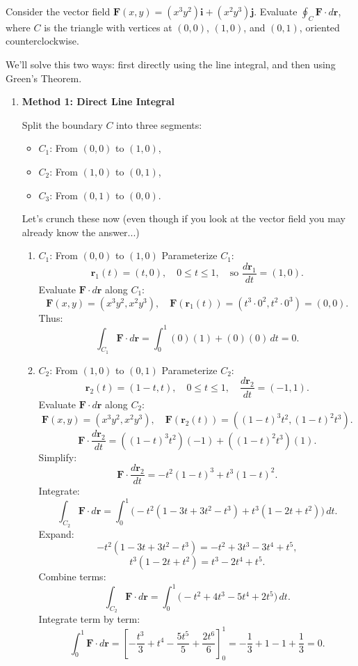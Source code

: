 \exampleline
\begin{example}
Consider the vector field $\mathbf{F}(x,y) = (x^3y^2)\mathbf{i} + (x^2y^3)\mathbf{j}$. Evaluate $\oint_C \mathbf{F}\cdot d\mathbf{r}$, where $C$ is the triangle with vertices at $(0,0)$, $(1,0)$, and $(0,1)$, oriented counterclockwise.

\begin{solution}
We'll solve this two ways: first directly using the line integral, and then using Green's Theorem.

\begin{enumerate}
\item \textbf{Method 1: Direct Line Integral}

Split the boundary \(C\) into three segments: 
\begin{itemize}
    \item \(C_1\): From \((0,0)\) to \((1,0)\),
    \item \(C_2\): From \((1,0)\) to \((0,1)\),
    \item \(C_3\): From \((0,1)\) to \((0,0)\).
\end{itemize}
Let's crunch these now (even though if you look at the vector field you may already know the answer...)
\begin{enumerate}
\item \(C_1\): From \((0,0)\) to \((1,0)\)
Parameterize \(C_1\):
\[
\mathbf{r}_1(t) = (t, 0), \quad 0 \leq t \leq 1, \quad \text{so } \frac{d\mathbf{r}_1}{dt} = (1, 0).
\]
Evaluate \(\mathbf{F} \cdot d\mathbf{r}\) along \(C_1\):
\[
\mathbf{F}(x,y) = (x^3y^2, x^2y^3), \quad \mathbf{F}(\mathbf{r}_1(t)) = (t^3 \cdot 0^2, t^2 \cdot 0^3) = (0, 0).
\]
Thus:
\[
\int_{C_1} \mathbf{F} \cdot d\mathbf{r} = \int_0^1 (0)(1) + (0)(0)\,dt = 0.
\]

\item \(C_2\): From \((1,0)\) to \((0,1)\)
Parameterize \(C_2\):
\[
\mathbf{r}_2(t) = (1-t, t), \quad 0 \leq t \leq 1, \quad \frac{d\mathbf{r}_2}{dt} = (-1, 1).
\]
Evaluate \(\mathbf{F} \cdot d\mathbf{r}\) along \(C_2\):
\[
\mathbf{F}(x,y) = (x^3y^2, x^2y^3), \quad \mathbf{F}(\mathbf{r}_2(t)) = ((1-t)^3t^2, (1-t)^2t^3).
\]
\[
\mathbf{F} \cdot \frac{d\mathbf{r}_2}{dt} = ((1-t)^3t^2)(-1) + ((1-t)^2t^3)(1).
\]
Simplify:
\[
\mathbf{F} \cdot \frac{d\mathbf{r}_2}{dt} = -t^2(1-t)^3 + t^3(1-t)^2.
\]
Integrate:
\[
\int_{C_2} \mathbf{F} \cdot d\mathbf{r} = \int_0^1 \big(-t^2(1-3t+3t^2-t^3) + t^3(1-2t+t^2)\big)\,dt.
\]
Expand:
\[
-t^2(1 - 3t + 3t^2 - t^3) = -t^2 + 3t^3 - 3t^4 + t^5,
\]
\[
t^3(1 - 2t + t^2) = t^3 - 2t^4 + t^5.
\]
Combine terms:
\[
\int_{C_2} \mathbf{F} \cdot d\mathbf{r} = \int_0^1 \big(-t^2 + 4t^3 - 5t^4 + 2t^5\big)\,dt.
\]
Integrate term by term:
\[
\int_0^1 \mathbf{F} \cdot d\mathbf{r} = \left[-\frac{t^3}{3} + t^4 - \frac{5t^5}{5} + \frac{2t^6}{6}\right]_0^1 = -\frac{1}{3} + 1 - 1 + \frac{1}{3} = 0.
\]


\end{enumerate}
\end{enumerate}
\end{solution}
\end{example}
